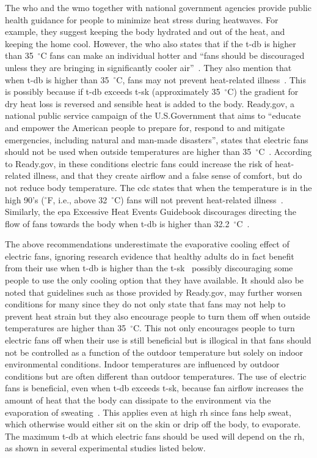 The \ac{who} and the \ac{wmo} together with national government agencies provide public health guidance for people to minimize heat stress during heatwaves.
For example, they suggest keeping the body hydrated and out of the heat, and keeping the home cool.
However, the \ac{who} also states that if the \ac{t-db} is higher than 35~$^{\circ}$C fans can make an individual hotter and ``fans should be discouraged unless they are bringing in significantly cooler air''~\cite{WMO2015}.
They also mention that when \ac{t-db} is higher than 35~$^{\circ}$C, fans may not prevent heat-related illness~\cite{HeatandH28:online}.
This is possibly because if \ac{t-db} exceeds \ac{t-sk} (approximately 35~$^{\circ}$C) the gradient for dry heat loss is reversed and sensible heat is added to the body.
Ready.gov, a national public service campaign of the U.S.\@ Government that aims to ``educate and empower the American people to prepare for, respond to and mitigate emergencies, including natural and man-made disasters'', states that electric fans should not be used when outside temperatures are higher than 35~$^{\circ}$C~\cite{ExtremeH66:online}.
According to Ready.gov, in these conditions electric fans could increase the risk of heat-related illness, and that they create airflow and a false sense of comfort, but do not reduce body temperature.
The \ac{cdc} states that when the temperature is in the high 90's ($^{\circ}$F, i.e., above 32~$^{\circ}$C) fans will not prevent heat-related illness~\cite{Frequent18:online}.
Similarly, the \ac{epa} Excessive Heat Events Guidebook discourages directing the flow of fans towards the body when \ac{t-db} is higher than 32.2~$^{\circ}$C~\cite{UnitedStatesEnvironmentalProtectionAgency2006}.

The above recommendations underestimate the evaporative cooling effect of electric fans, ignoring research evidence that healthy adults do in fact benefit from their use when \ac{t-db} is higher than the \ac{t-sk}~\cite{Jay2019a, Rate2015, Jay2015, Gagnon2017} possibly discouraging some people to use the only cooling option that they have available.
It should also be noted that guidelines such as those provided by Ready.gov, may further worsen conditions for many since they do not only state that fans may not help to prevent heat strain but they also encourage people to turn them off when outside temperatures are higher than 35~$^{\circ}$C\@.
This not only encourages people to turn electric fans off when their use is still beneficial but is illogical in that fans should not be controlled as a function of the outdoor temperature but solely on indoor environmental conditions. 
Indoor temperatures are influenced by outdoor conditions but are often different than outdoor temperatures. 
The use of electric fans is beneficial, even when \ac{t-db} exceeds \ac{t-sk}, because fan airflow increases the amount of heat that the body can dissipate to the environment via the evaporation of sweating~\cite{Jay2015}.
This applies even at high \ac{rh} since fans help sweat, which otherwise would either sit on the skin or drip off the body, to evaporate.
The maximum \ac{t-db} at which electric fans should be used will depend on the \ac{rh}, as shown in several experimental studies listed below.

